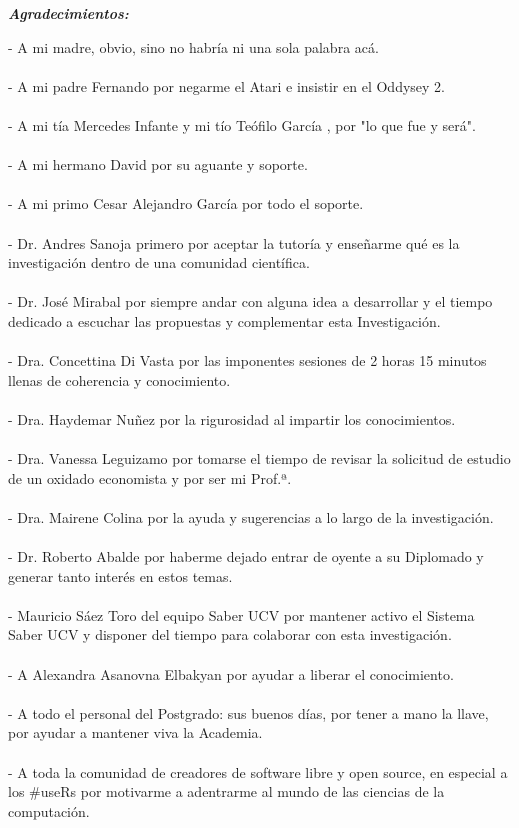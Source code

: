 \documentclass[
  12pt,
  openany]{book}
\begin{document}
\newpage
\begin{center}
\large{\textbf{\emph{\Huge{Agradecimientos:}}}}
\end{center}
\thispagestyle{empty}
\vspace*{2cm}
\thispagestyle{empty}

- A mi madre, obvio, sino no habría ni una sola palabra acá.\\\\
- A mi padre Fernando por negarme el Atari e insistir en el Oddysey 2.\\\\
- A mi tía Mercedes Infante y mi tío Teófilo García \textdagger, por "lo que fue y será".\\\\
- A mi hermano David por su aguante y soporte.\\\\
- A mi primo Cesar Alejandro García por todo el soporte.\\\\
- Dr. Andres Sanoja primero por aceptar la tutoría y enseñarme qué es la investigación dentro de una comunidad científica.\\\\
- Dr. José Mirabal por siempre andar con alguna idea a desarrollar y el tiempo dedicado a escuchar las propuestas y complementar esta Investigación.\\\\
- Dra. Concettina Di Vasta por las imponentes sesiones de 2 horas 15 minutos llenas de coherencia y conocimiento.\\\\
- Dra. Haydemar Nuñez por la rigurosidad al impartir los conocimientos.\\\\
- Dra. Vanessa Leguizamo por tomarse el tiempo de revisar la solicitud de estudio de un oxidado economista y por ser mi Prof.ª.\\\\
- Dra. Mairene Colina por la ayuda y sugerencias a lo largo de la investigación.\\\\
- Dr. Roberto Abalde por haberme dejado entrar de oyente a su Diplomado y generar tanto interés en estos temas.\\\\
- Mauricio Sáez Toro del equipo Saber UCV por mantener activo el Sistema Saber UCV y disponer del tiempo para colaborar con esta investigación.\\\\
- A Alexandra Asanovna Elbakyan por ayudar a liberar el conocimiento.\\\\
- A todo el personal del Postgrado: sus buenos días, por tener a mano la llave, por ayudar a mantener viva la Academia.\\\\
- A toda la comunidad de creadores de software libre y open source, en especial a los \#useRs por motivarme a adentrarme al mundo de las ciencias de la computación.\\\\
\end{document}
